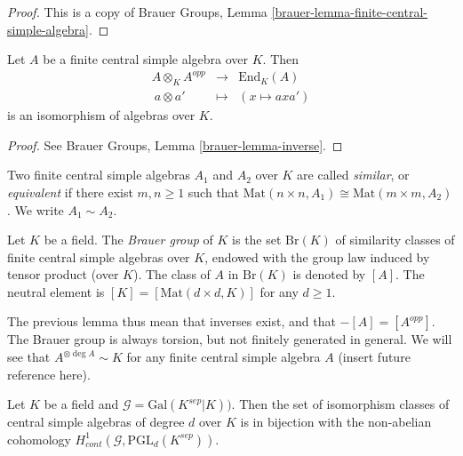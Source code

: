 \begin{proof}
This is a copy of
Brauer Groups, Lemma \ref{brauer-lemma-finite-central-simple-algebra}.
\end{proof}

\begin{lemma}
\label{lemma-brauer-inverse}
Let $A$ be a finite central simple algebra over $K$. Then
$$
\begin{matrix}
A \otimes_K A^{opp} & \longrightarrow & \text{End}_K(A) \\
\ a \otimes a' & \longmapsto & (x \mapsto a x a')
\end{matrix}
$$
is an isomorphism of algebras over $K$.
\end{lemma}

\begin{proof}
See
Brauer Groups, Lemma \ref{brauer-lemma-inverse}.
\end{proof}

\begin{definition}
\label{definition-brauer-equivalent}
Two finite central simple algebras $A_1$ and $A_2$ over $K$ are called
{\it similar}, or {\it equivalent} if there exist $m, n \geq 1$
such that $\text{Mat}(n \times n, A_1)
\cong \text{Mat}(m \times m, A_2)$. We write $A_1 \sim A_2$.
\end{definition}

\begin{definition}
\label{definition-brauer-group}
Let $K$ be a field. The {\it Brauer group} of $K$ is the set $\text{Br} (K)$
of similarity classes of finite central simple algebras over $K$, endowed with
the group law induced by tensor product (over $K$). The class of $A$ in
$\text{Br}(K)$ is denoted by $[A]$. The neutral element is
$[K] = [\text{Mat}(d \times d, K)]$ for any $d \geq 1$.
\end{definition}

\noindent
The previous lemma thus mean that inverses exist, and that $-[A] = [A^{opp}]$.
The Brauer group is always torsion, but not finitely generated in general.
We will see that $A^{\otimes \deg A} \sim K$ for any finite central simple
algebra $A$ (insert future reference here).

\begin{lemma}
\label{lemma-central-simple-algebra-pgln}
Let $K$ be a field and $\mathcal{G} = \text{Gal}(K^{sep}|K))$. Then the set of
isomorphism classes of central simple algebras of degree $d$ over $K$ is in
bijection with the non-abelian cohomology
$H_{cont}^1 (\mathcal{G}, \text{PGL}_d(K^{sep}))$.
\end{lemma}

